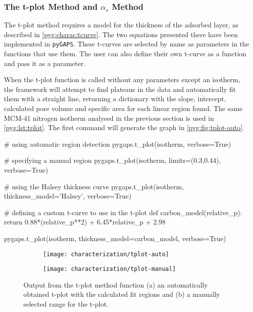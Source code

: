\subsubsection{The t-plot Method and \(\alpha_s\) Method}

The t-plot method requires a model for the thickness of 
the adsorbed layer, as described in \autoref{pyg:charac:tcurve}.
The two equations presented there have been implemented in \texttt{pyGAPS}.
These t-curves are selected by name as parameters in
the functions that use them. The user can also define their
own t-curve as a function and pass it as a parameter.

When the t-plot function is called without any parameters
except an isotherm, the framework will attempt to find 
plateaus in the data and
automatically fit them with a straight line, returning a dictionary
with the slope, intercept, calculated pore volume and specific area
for each linear region found. 
The same MCM-41 nitrogen isotherm analysed in the previous section is
used in \autoref{pyg:lst:tplot}. The first command will generate the
graph in \autoref{pyg:fig:tplot-auto}. 

\begin{python}[float=htb, caption={Generating a t-plot},%
    label={pyg:lst:tplot}]
# using automatic region detection
pygaps.t_plot(isotherm, verbose=True)

# specifying a manual region
pygaps.t_plot(isotherm, limits=(0.3,0.44), verbose=True)

# using the Halsey thickness curve
pygaps.t_plot(isotherm, thickness_model='Halsey', verbose=True)

# defining a custom t-curve to use in the t-plot
def carbon_model(relative_p):
	return 0.88*(relative_p**2) + 6.45*relative_p + 2.98

pygaps.t_plot(isotherm, thickness_model=carbon_model, verbose=True)
\end{python}

\begin{figure}[!htb]
	\centering

	\begin{subfigure}{0.45\linewidth}
		\parbox[c]{0.1\linewidth}{\caption{}%
			\label{pyg:fig:tplot-auto}}
		\parbox[b]{0.85\linewidth}{%
			\texttt{[image: characterization/tplot-auto]}}
	\end{subfigure}%
	\begin{subfigure}{0.45\linewidth}
		\parbox[c]{0.1\linewidth}{\caption{}%
			\label{pyg:fig:tplot-manual}}
		\parbox[b]{0.85\linewidth}{%
			\texttt{[image: characterization/tplot-manual]}}
	\end{subfigure}%

	\caption{Output from the t-plot method function (a) an automatically
		obtained t-plot with the calculated fit regions and (b) a manually
		selected range for the t-plot.}%
	\label{pyg:fig:tplot}

\end{figure}

